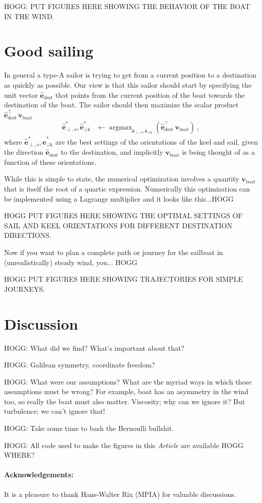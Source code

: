 \documentclass{article}
\DeclareMathOperator*{\argmax}{argmax}
\renewcommand{\vec}[1]{\boldsymbol{#1}}
\newcommand{\uvec}{\vec{\hat{e}}}
\newcommand{\boat}{\text{boat}}
\newcommand{\destination}{\text{dest}}
\newcommand{\sail}{\text{s}}
\newcommand{\keel}{\text{k}}
\newcommand{\vboat}{\vec{v}_\boat}
\newcommand{\documentname}{\textsl{Article}}
\begin{document}
HOGG: PUT FIGURES HERE SHOWING THE BEHAVIOR OF THE BOAT IN THE WIND.

\section{Good sailing}

In general a type-A sailor is trying to get from a current position to a destination as quickly as possible.
Our view is that this sailor should start by specifying the unit vector $\uvec_\destination$ that points from the current position of the boat towards the destination of the boat.
The sailor should then maximize the scalar product $\uvec_\destination^\top\,\vboat$
\begin{align}
    \uvec_{\perp,\sail}^\ast,\uvec_{\perp\keel}^\ast &\leftarrow \argmax_{\uvec_{\perp,\sail},\uvec_{\perp\keel}} (\uvec_\destination^\top\,\vboat) ~,
\end{align}
where $\uvec_{\perp,\sail}^\ast,\uvec_{\perp\keel}^\ast$ are the best settings of the orientations of the keel and sail, given the direction $\uvec_\destination$ to the destination, and implicitly $\vboat$ is being thought of as a function of these orientations.

While this is simple to state, the numerical optimization involves a quantity $\vboat$ that is itself the root of a quartic expression.
Numerically this optimization can be implemented using a Lagrange multiplier and it looks like this...HOGG

HOGG PUT FIGURES HERE SHOWING THE OPTIMAL SETTINGS OF SAIL AND KEEL ORIENTATIONS FOR DIFFERENT DESTINATION DIRECTIONS.

Now if you want to plan a complete path or journey for the sailboat in (unrealistically) steady wind, you... HOGG

HOGG PUT FIGURES HERE SHOWING TRAJECTORIES FOR SIMPLE JOURNEYS.

\section{Discussion}

HOGG: What did we find? What's important about that?

HOGG: Galilean symmetry, coordinate freedom?

HOGG: What were our assumptions? What are the myriad ways in which those assumptions must be wrong? For example, boat has an asymmetry in the wind too, so really the boat must also matter. Viscosity; why can we ignore it? But turbulence; we can't ignore that!

HOGG: Take some time to bash the Bernoulli bullshit.

HOGG: All code used to make the figures in this \documentname{} are available HOGG WHERE?

\paragraph{Acknowledgements:}
It is a pleasure to thank Hans-Walter Rix (MPIA) for valuable discussions.

\raggedright
\printbibliography
\end{document}
